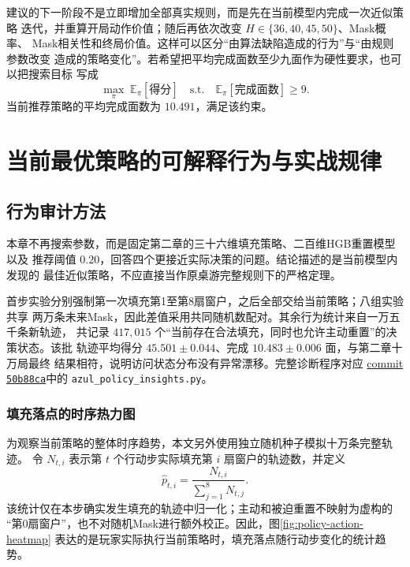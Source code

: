 \documentclass[UTF8,11pt,openany]{ctexrep}
\begin{document}
建议的下一阶段不是立即增加全部真实规则，而是先在当前模型内完成一次近似策略
迭代，并重算开局动作价值；随后再依次改变 $H\in\{36,40,45,50\}$、Mask概率、
Mask相关性和终局价值。这样可以区分“由算法缺陷造成的行为”与“由规则参数改变
造成的策略变化”。若希望把平均完成面数至少九面作为硬性要求，也可以把搜索目标
写成
\[
\max_{\pi}\;\mathbb{E}_{\pi}[\text{得分}]
\quad\text{s.t.}\quad
\mathbb{E}_{\pi}[\text{完成面数}]\ge 9.
\]
当前推荐策略的平均完成面数为 $10.491$，满足该约束。

\chapter{当前最优策略的可解释行为与实战规律}

\section{行为审计方法}

本章不再搜索参数，而是固定第二章的三十六维填充策略、二百维HGB重置模型以及
推荐阈值 $0.20$，回答四个更接近实际决策的问题。结论描述的是当前模型内发现的
最佳近似策略，不应直接当作原桌游完整规则下的严格定理。

首步实验分别强制第一次填充第1至第8扇窗户，之后全部交给当前策略；八组实验共享
两万条未来Mask，因此差值采用共同随机数配对。其余行为统计来自一万五千条新轨迹，
共记录 $417{,}015$ 个“当前存在合法填充，同时也允许主动重置”的决策状态。该批
轨迹平均得分 $45.501\pm0.044$、完成 $10.483\pm0.006$ 面，与第二章十万局最终
结果相符，说明访问状态分布没有异常漂移。完整诊断程序对应
\href{https://github.com/CYZ-gmail/azul-stained-glass-strategy/commit/50b88ca95341f4de82c26bfd0c19d29a608364f3}%
{commit \texttt{50b88ca}}中的 \texttt{azul\_policy\_insights.py}。

\subsection{填充落点的时序热力图}

为观察当前策略的整体时序趋势，本文另外使用独立随机种子模拟十万条完整轨迹。
令 $N_{t,i}$ 表示第 $t$ 个行动步实际填充第 $i$ 扇窗户的轨迹数，并定义
\[
\widehat p_{t,i}
=\frac{N_{t,i}}{\sum_{j=1}^{8}N_{t,j}}.
\]
该统计仅在本步确实发生填充的轨迹中归一化；主动和被迫重置不映射为虚构的
“第0扇窗户”，也不对随机Mask进行额外校正。因此，图\ref{fig:policy-action-heatmap}
表达的是玩家实际执行当前策略时，填充落点随行动步变化的统计趋势。
\end{document}
